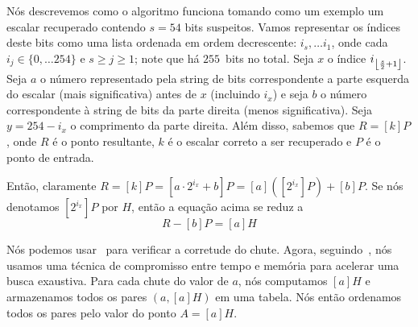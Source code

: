 Nós descrevemos como o algoritmo funciona tomando como um exemplo um escalar recuperado contendo $s=54$ bits suspeitos. Vamos representar os índices deste bits como uma lista ordenada em ordem decrescente: $i_s, \dots i_1$,
onde cada $i_j \in \{0, \dots 254\}$ e $s \ge j \ge 1$; note que há $255$~bits no total. Seja $x$ o índice $i_{\floor*{\frac{s}{2} + 1}}$.
Seja $a$ o número representado pela string de bits correspondente a parte esquerda do escalar (mais significativa) antes de $x$ (incluindo $i_x$) e seja $b$ o número correspondente à string de bits da parte direita (menos significativa).
Seja $y=254-i_x$ o comprimento da parte direita. Além disso, sabemos que $R = [k] P$,
onde $R$ é o ponto resultante, $k$ é o escalar correto a ser recuperado e $P$ é o ponto de entrada.


Então, claramente $R = [k] P = [a \cdot 2^{i_x} + b] P = [a] ([2^{i_x}] P) + [b] P$. 
Se nós denotamos $[2^{i_x}] P$ por $H$, então a equação acima se reduz a
\begin{equation}\label{eq:check}
R - [b] P = [a] H
\end{equation}


Nós podemos usar~ para verificar a corretude do chute. Agora, seguindo~\cite{Gopalakrishnan2007}, nós usamos uma técnica de compromisso entre tempo e memória para acelerar uma busca exaustiva.
Para cada chute do valor de $a$, nós computamos $[a] H$ e armazenamos todos os pares $(a, [a] H)$ em uma tabela. Nós então ordenamos todos os pares pelo valor do ponto $A = [a] H$.


